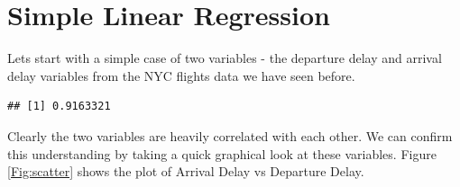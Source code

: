 \documentclass[10pt, letterpaper, twoside]{memoir}\usepackage{knitr}
\begin{document}
\section{Simple Linear Regression}

Lets start with a simple case of two variables - the departure delay and arrival delay variables from the NYC flights data we have seen before.

\begin{knitrout}
\color{fgcolor}\begin{kframe}
\begin{alltt}
 \hlkwb{<-} \hlstd{(}\hlstd{)}
\end{alltt}
\end{kframe}
\end{knitrout}

\begin{knitrout}
\color{fgcolor}\begin{kframe}
\begin{alltt}
\end{alltt}
\end{kframe}
\end{knitrout}

\begin{knitrout}
\color{fgcolor}\begin{kframe}
\begin{alltt}
  \hlstd{=} \hlstd{)}
\end{alltt}
\begin{verbatim}
## [1] 0.9163321
\end{verbatim}
\end{kframe}
\end{knitrout}

  Clearly the two variables are heavily correlated with each other. We can confirm this understanding by taking a quick graphical look at these variables. Figure \ref{Fig:scatter}  shows the plot of Arrival Delay vs Departure Delay. 
\end{document}
